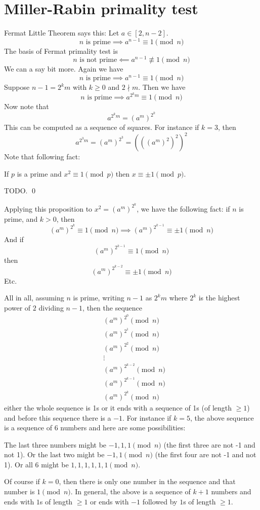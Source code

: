 \section{Miller-Rabin primality test}

Fermat Little Theorem says this:
Let $a \in [2, n - 2]$.
\[
\text{$n$ is prime} \implies a^{n-1} \equiv 1 \pmod{n}
\]
The basis of Fermat primality test is
\[
\text{$n$ is not prime} \impliedby a^{n-1} \not\equiv 1 \pmod{n}
\]
We can a say bit more.
Again we have
\[
\text{$n$ is prime} \implies a^{n-1} \equiv 1 \pmod{n}
\]
Suppose $n - 1 = 2^k m$ with $k \geq 0$ and $2 \nmid m$.
Then we have
\[
\text{$n$ is prime} \implies a^{2^k m} \equiv 1 \pmod{n}
\]
Now note that
\[
a^{2^k m} = (a^m)^{2^k}
\]
This can be computed as a sequence of squares.
For instance if $k = 3$, then
\[
a^{2^3 m} = (a^m)^{2^3} = (((a^m)^2)^2)^2 
\]
Note that following fact:

\begin{prop}
  If $p$ is a prime and $x^2 \equiv 1 \pmod{p}$ then $x \equiv \pm 1 \pmod{p}$.
\end{prop}
\proof
TODO.
\qed

Applying this proposition to $x^2 = (a^m)^{2^k}$, we have the following fact:
if $n$ is prime, and $k > 0$, then
\[
(a^m)^{2^k} \equiv 1 \pmod{n} \implies (a^m)^{2^{k - 1}} \equiv \pm 1 \pmod{n}
\]
And if
\[
(a^m)^{2^{k - 1}} \equiv 1 \pmod{n}
\]
then
\[
(a^m)^{2^{k - 2}} \equiv \pm 1 \pmod{n}
\]
Etc.

All in all, assuming $n$ is prime,
writing $n - 1$ as $2^k m$ where $2^k$ is the highest
power of $2$ dividing $n - 1$, then the sequence
\begin{align*}
  & (a^m)^{2^0} \pmod{n} \\
  & (a^m)^{2^1} \pmod{n} \\
  & (a^m)^{2^2} \pmod{n} \\
  & \vdots \\
  & (a^m)^{2^{k-2}} \pmod{n} \\
  & (a^m)^{2^{k-1}} \pmod{n} \\
  & (a^m)^{2^k} \pmod{n}
\end{align*}
either the whole sequence is 1s or it
ends with a sequence of 1s (of length $\geq 1$)
and before this sequence there is a $-1$.
For instance if $k = 5$, the above sequence is a sequence of 6 numbers
and here are some possibilities:
\begin{enumerate}[nosep]
\li The last three numbers might be $-1, 1, 1 \pmod{n}$ (the first three are not -1 and not 1).
\li Or the last two might be $-1, 1 \pmod{n}$ (the first four are not -1 and not 1).
\li Or all 6 might be $1, 1, 1, 1, 1, 1 \pmod{n}$.
\end{enumerate}
Of course if $k = 0$, then there is only one number in the sequence and that number is $1 \pmod{n}$.
In general, the above is a sequence of $k + 1$ numbers
and ends with $1$s of length $\geq 1$ or ends with $-1$ followed by $1$s of length $\geq 1$.

